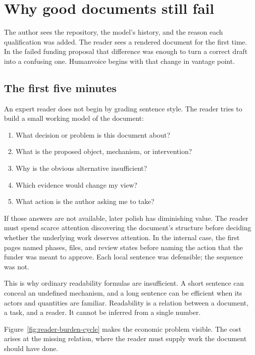 \chapter{Why good documents still fail}
\label{ch:problem}

The author sees the repository, the model's history, and the reason each
qualification was added. The reader sees a rendered document for the first
time. In the failed funding proposal that difference was enough to turn a
correct draft into a confusing one. Humanvoice begins with that change in
vantage point.

\section{The first five minutes}

An expert reader does not begin by grading sentence style. The reader tries to
build a small working model of the document:

\begin{enumerate}
\item What decision or problem is this document about?
\item What is the proposed object, mechanism, or intervention?
\item Why is the obvious alternative insufficient?
\item Which evidence would change my view?
\item What action is the author asking me to take?
\end{enumerate}

If those answers are not available, later polish has diminishing value. The
reader must spend scarce attention discovering the document's structure before
deciding whether the underlying work deserves attention. In the internal case,
the first pages named phases, files, and review states before naming the action
that the funder was meant to approve. Each local sentence was defensible;
the sequence was not.

This is why ordinary readability formulas are insufficient. A short sentence
can conceal an undefined mechanism, and a long sentence can be efficient when
its actors and quantities are familiar. Readability is a relation between a
document, a task, and a reader. It cannot be inferred from a single number.

Figure~\ref{fig:reader-burden-cycle} makes the economic problem visible. The
cost arises at the missing relation, where the reader must supply work the
document should have done.


